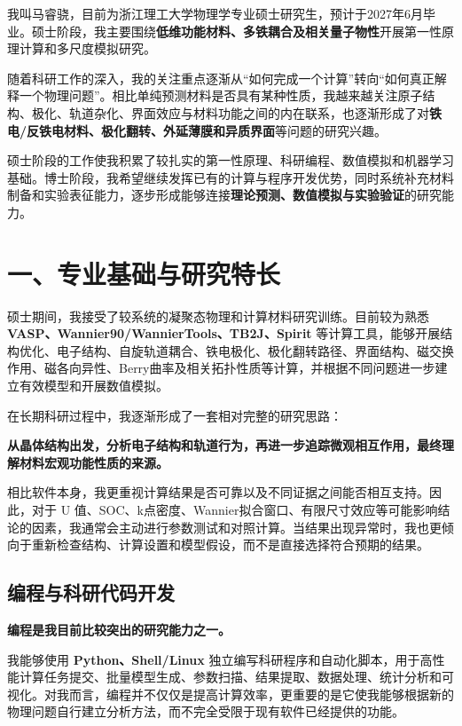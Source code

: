 我叫马睿骁，目前为浙江理工大学物理学专业硕士研究生，预计于2027年6月毕业。硕士阶段，我主要围绕\textbf{低维功能材料、多铁耦合及相关量子物性}开展第一性原理计算和多尺度模拟研究。

随着科研工作的深入，我的关注重点逐渐从“如何完成一个计算”转向“如何真正解释一个物理问题”。相比单纯预测材料是否具有某种性质，我越来越关注原子结构、极化、轨道杂化、界面效应与材料功能之间的内在联系，也逐渐形成了对\textbf{铁电/反铁电材料、极化翻转、外延薄膜和异质界面}等问题的研究兴趣。

硕士阶段的工作使我积累了较扎实的第一性原理、科研编程、数值模拟和机器学习基础。博士阶段，我希望继续发挥已有的计算与程序开发优势，同时系统补充材料制备和实验表征能力，逐步形成能够连接\textbf{理论预测、数值模拟与实验验证}的研究能力。

\section{一、专业基础与研究特长}

硕士期间，我接受了较系统的凝聚态物理和计算材料研究训练。目前较为熟悉 \textbf{VASP、Wannier90/WannierTools、TB2J、Spirit} 等计算工具，能够开展结构优化、电子结构、自旋轨道耦合、铁电极化、极化翻转路径、界面结构、磁交换作用、磁各向异性、Berry曲率及相关拓扑性质等计算，并根据不同问题进一步建立有效模型和开展数值模拟。

在长期科研过程中，我逐渐形成了一套相对完整的研究思路：

\textbf{从晶体结构出发，分析电子结构和轨道行为，再进一步追踪微观相互作用，最终理解材料宏观功能性质的来源。}

相比软件本身，我更重视计算结果是否可靠以及不同证据之间能否相互支持。因此，对于 U 值、SOC、k点密度、Wannier拟合窗口、有限尺寸效应等可能影响结论的因素，我通常会主动进行参数测试和对照计算。当结果出现异常时，我也更倾向于重新检查结构、计算设置和模型假设，而不是直接选择符合预期的结果。

\subsection*{编程与科研代码开发}

\textbf{编程是我目前比较突出的研究能力之一。}

我能够使用 \textbf{Python、Shell/Linux} 独立编写科研程序和自动化脚本，用于高性能计算任务提交、批量模型生成、参数扫描、结果提取、数据处理、统计分析和可视化。对我而言，编程并不仅仅是提高计算效率，更重要的是它使我能够根据新的物理问题自行建立分析方法，而不完全受限于现有软件已经提供的功能。

